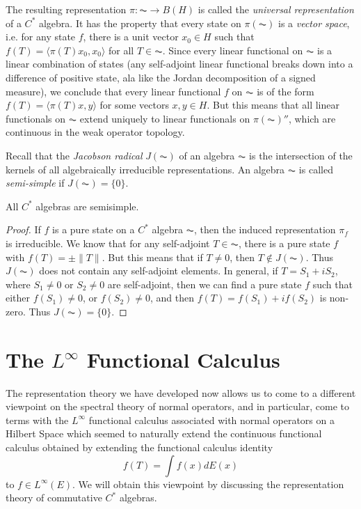 The resulting representation $\pi: \AC \to B(H)$ is called the \emph{universal representation} of a $C^*$ algebra. It has the property that every state on $\pi(\AC)$ is a \emph{vector space}, i.e. for any state $f$, there is a unit vector $x_0 \in H$ such that $f(T) = \langle \pi(T) x_0, x_0 \rangle$ for all $T \in \AC$. Since every linear functional on $\AC$ is a linear combination of states (any self-adjoint linear functional breaks down into a difference of positive state, ala like the Jordan decomposition of a signed measure), we conclude that every linear functional $f$ on $\AC$ is of the form $f(T) = \langle \pi(T) x, y \rangle$ for some vectors $x,y \in H$. But this means that all linear functionals on $\AC$ extend uniquely to linear functionals on $\pi(\AC)''$, which are continuous in the weak operator topology.

Recall that the \emph{Jacobson radical} $J(\AC)$ of an algebra $\AC$ is the intersection of the kernels of all algebraically irreducible representations. An algebra $\AC$ is called \emph{semi-simple} if $J(\AC) = \{ 0 \}$.

\begin{corollary}
    All $C^*$ algebras are semisimple.
\end{corollary}
\begin{proof}
    If $f$ is a pure state on a $C^*$ algebra $\AC$, then the induced representation $\pi_f$ is irreducible. We know that for any self-adjoint $T \in \AC$, there is a pure state $f$ with $f(T) = \pm \| T \|$. But this means that if $T \neq 0$, then $T \not \in J(\AC)$. Thus $J(\AC)$ does not contain any self-adjoint elements. In general, if $T = S_1 + i S_2$, where $S_1 \neq 0$ or $S_2 \neq 0$ are self-adjoint, then we can find a pure state $f$ such that either $f(S_1) \neq 0$, or $f(S_2) \neq 0$, and then $f(T) = f(S_1) + i f(S_2)$ is non-zero. Thus $J(\AC) = \{ 0 \}$.
\end{proof}







\section{The $L^\infty$ Functional Calculus}

The representation theory we have developed now allows us to come to a different viewpoint on the spectral theory of normal operators, and in particular, come to terms with the $L^\infty$ functional calculus associated with normal operators on a Hilbert Space which seemed to naturally extend the continuous functional calculus obtained by extending the functional calculus identity
%
\[ f(T) = \int f(x) dE(x) \]
%
to $f \in L^\infty(E)$. We will obtain this viewpoint by discussing the representation theory of commutative $C^*$ algebras.

